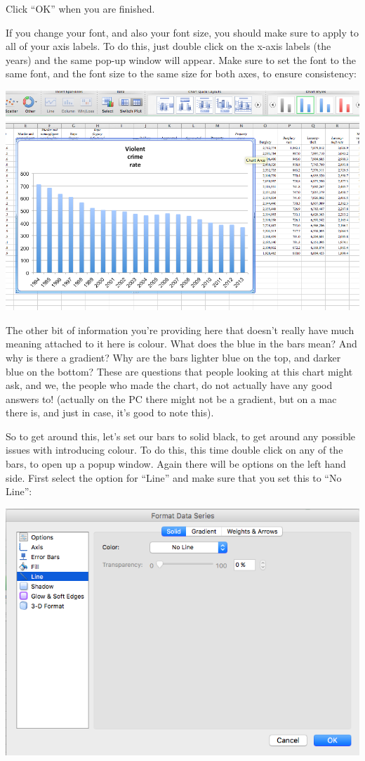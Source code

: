 \documentclass[
]{book}
\begin{document}
Click ``OK'' when you are finished.

If you change your font, and also your font size, you should make sure to apply to all of your axis labels. To do this, just double click on the x-axis labels (the years) and the same pop-up window will appear. Make sure to set the font to the same font, and the font size to the same size for both axes, to ensure consistency:

\includegraphics{imgs/desc_viz_10.png}

The other bit of information you're providing here that doesn't really have much meaning attached to it here is colour. What does the blue in the bars mean? And why is there a gradient? Why are the bars lighter blue on the top, and darker blue on the bottom? These are questions that people looking at this chart might ask, and we, the people who made the chart, do not actually have any good answers to!
(actually on the PC there might not be a gradient, but on a mac there is, and just in case, it's good to note this).

So to get around this, let's set our bars to solid black, to get around any possible issues with introducing colour. To do this, this time double click on any of the bars, to open up a popup window. Again there will be options on the left hand side. First select the option for ``Line'' and make sure that you set this to ``No Line'':

\includegraphics{imgs/desc_viz_11.png}
\end{document}
